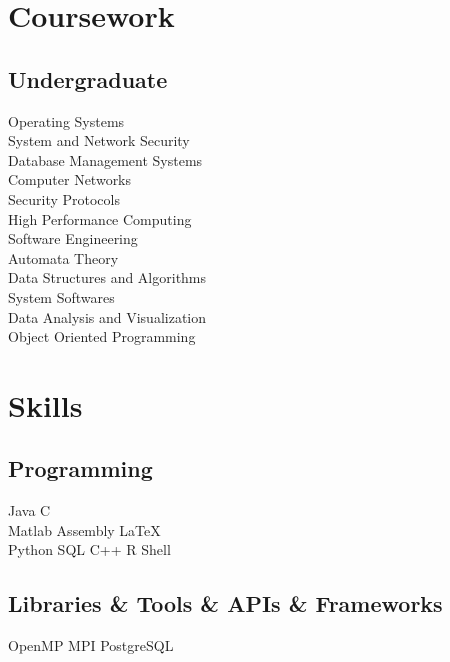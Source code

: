 \documentclass[]{deedy-resume-openfont}
\begin{document}
\begin{minipage}[t]{0.33\textwidth}

\section{Coursework}
\subsection{Undergraduate}
Operating Systems \\
System and Network Security \\
Database Management Systems \\
Computer Networks \\
Security Protocols \\
High Performance Computing\\
Software Engineering\\
Automata Theory\\
Data Structures and Algorithms\\
System Softwares\\
Data Analysis and Visualization\\
Object Oriented Programming\\
\sectionsep


\section{Skills}
\subsection{Programming}
\textbullet{} Java  \textbullet{} C \\
\textbullet{} Matlab \textbullet{} Assembly \textbullet{} \LaTeX{}\\
\textbullet{} Python \textbullet{} SQL \textbullet{} C++ \textbullet{} R \textbullet{} Shell
\sectionsep

\subsection{\texorpdfstring{Libraries \& Tools \& \newline APIs \& Frameworks}{}}
\textbullet{} OpenMP \textbullet{} MPI \textbullet{} PostgreSQL
\sectionsep

%
%

\end{minipage} 
\end{document}
